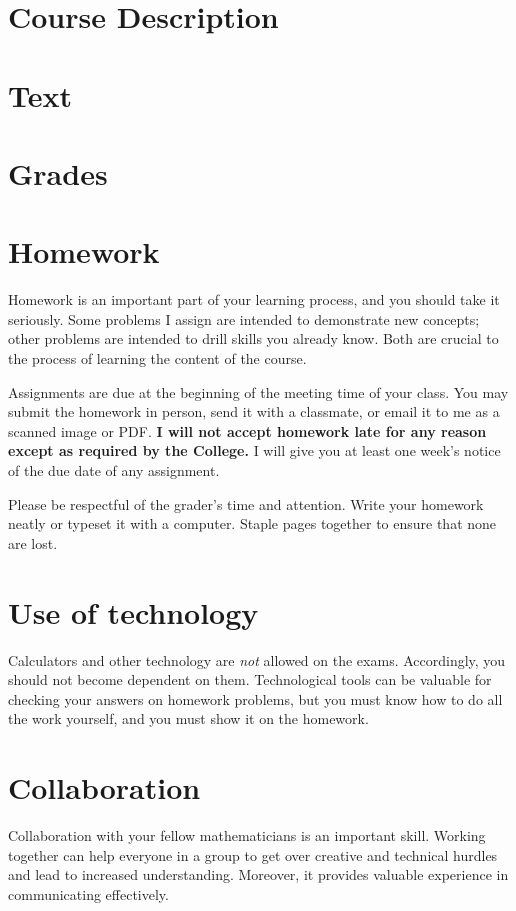 \documentclass[11pt,article]{memoir}
\begin{document}
\maketitle

\section*{Course Description}

\section*{Text}

\section*{Grades}

\section*{Homework}
Homework is an important part of your learning process, and you should take it seriously.
Some problems I assign are intended to demonstrate new concepts; other problems are intended to drill skills you already know.
Both are crucial to the process of learning the content of the course.

Assignments are due at the beginning of the meeting time of your class.
You may submit the homework in person, send it with a classmate, or email it to me as a scanned image or PDF.
\textbf{I will not accept homework late for any reason except as required by the College.}
I will give you at least one week's notice of the due date of any assignment.

Please be respectful of the grader's time and attention.
Write your homework neatly or typeset it with a computer.
Staple pages together to ensure that none are lost.

\section*{Use of technology}
Calculators and other technology are \emph{not} allowed on the exams.
Accordingly, you should not become dependent on them.
Technological tools can be valuable for checking your answers on homework problems, but you must know how to do all the work yourself, and you must show it on the homework.

\section*{Collaboration}
Collaboration with your fellow mathematicians is an important skill.
Working together can help everyone in a group to get over creative and technical hurdles and lead to increased understanding.
Moreover, it provides valuable experience in communicating effectively.
\end{document}
